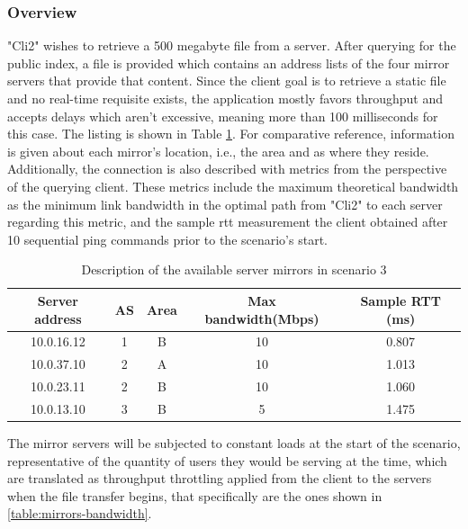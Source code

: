 \label{ssec:scenario3}

\subsubsection{Overview}

    "Cli2" wishes to retrieve a 500 megabyte file from a server.
    After querying for the public index, a file is provided which contains an address lists of the four mirror servers that provide that content.
    Since the client goal is to retrieve a static file and no real-time requisite exists, the application mostly favors throughput and accepts delays which aren't excessive, meaning more than 100 milliseconds for this case.
    The listing is shown in Table \ref{table:server-mirrors}.
    For comparative reference, information is given about each mirror's location, i.e., the area and \gls{as} where they reside.
    Additionally, the connection is also described with metrics from the perspective of the querying client. 
    These metrics include the maximum theoretical bandwidth as the minimum link bandwidth in the optimal path from "Cli2" to each server regarding this metric, and the sample \gls{rtt} measurement the client obtained after 10 sequential ping commands prior to the scenario's start.

\begin{table}[H]
\centering
\begin{tabular}{|c|c|c|c|c|}
    \hline
    \textbf{Server address} & \textbf{AS} & \textbf{Area} & \textbf{Max bandwidth(Mbps)} & \textbf{Sample RTT (ms)}  \\ \hline
    10.0.16.12              & 1           & B   & 10  & 0.807 \\ \hline
    10.0.37.10              & 2           & A   & 10  & 1.013 \\ \hline
    10.0.23.11              & 2           & B   & 10  & 1.060 \\ \hline
    10.0.13.10              & 3           & B   & 5   & 1.475 \\ \hline
\end{tabular}
\caption{Description of the available server mirrors in scenario 3}
\label{table:server-mirrors}
\end{table}

The mirror servers will be subjected to constant loads at the start of the scenario, representative of the quantity of users they would be serving at the time, which are translated as throughput throttling applied from the client to the servers when the file transfer begins, that specifically are the ones shown in \ref{table:mirrors-bandwidth}.

